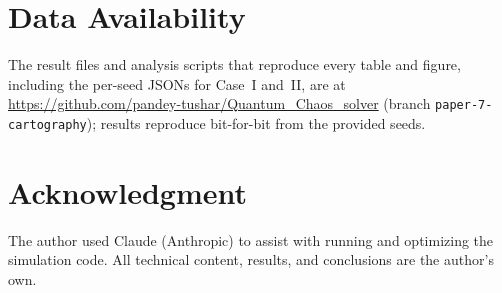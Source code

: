 ﻿\documentclass[10pt,conference]{IEEEtran}
\begin{document}
\section*{Data Availability}

The result files and analysis scripts that reproduce every table and figure,
including the per-seed JSONs for Case~I and~II, are at
\url{https://github.com/pandey-tushar/Quantum_Chaos_solver} (branch
\texttt{paper-7-cartography}); results reproduce bit-for-bit from the provided
seeds.

\section*{Acknowledgment}

The author used Claude (Anthropic) to assist with running and optimizing the
simulation code. All technical content, results, and conclusions are the
author's own.
\end{document}
